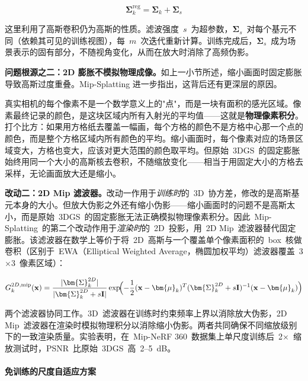 \begin{equation}
\bm{\Sigma}_k^{\mathrm{reg}} = \bm{\Sigma}_k + \bm{\Sigma}_s
\end{equation}

这里利用了高斯卷积仍为高斯的性质。滤波强度~$s$~为超参数，$\bm{\Sigma}_s$~对每个基元不同（依赖其可见的训练视图），每~$m$~次迭代重新计算。训练完成后，$\bm{\Sigma}_s$~成为场景表示的固有部分，不随视角变化，从而在放大时消除了高频伪影。

\textbf{问题根源之二：2D 膨胀不模拟物理成像。}如上一小节所述，缩小画面时固定膨胀导致高斯过度重叠。Mip-Splatting 进一步指出，这背后还有更深层的原因。

真实相机的每个像素不是一个数学意义上的"点"，而是一块有面积的感光区域。像素最终记录的颜色，是这块区域内所有入射光的平均值——这就是\textbf{物理像素积分}。打个比方：如果用方格纸去覆盖一幅画，每个方格的颜色不是方格中心那一个点的颜色，而是整个方格区域内所有颜色的平均。缩小画面时，每个像素对应的场景区域变大，方格也变大，应该对更大范围的颜色取平均。但原始~3DGS~的固定膨胀始终用同一个大小的高斯核去卷积，不随缩放变化——相当于用固定大小的方格去采样，无论画面放大还是缩小。

\textbf{改动二：2D Mip 滤波器。}改动一作用于\emph{训练时}的~3D~协方差，修改的是高斯基元本身的大小。但放大伪影之外还有缩小伪影——缩小画面时的问题不是高斯太小，而是原始~3DGS~的固定膨胀无法正确模拟物理像素积分。因此~Mip-Splatting~的第二个改动作用于\emph{渲染时}的~2D~投影，用~2D Mip~滤波器替代固定膨胀。该滤波器在数学上等价于将~2D~高斯与一个覆盖单个像素面积的~box~核做卷积（区别于~EWA（Elliptical Weighted Average，椭圆加权平均）滤波器覆盖~3$\times$3~像素区域）：

\[
G_k^{2D,\mathrm{mip}}(\mathbf{x}) = \frac{|\bm{\Sigma}_k^{2D}|}{|\bm{\Sigma}_k^{2D} + s\mathbf{I}|}\exp\!\Bigl(-\frac{1}{2}(\mathbf{x}-\bm{\mu}_k)^T(\bm{\Sigma}_k^{2D}+s\mathbf{I})^{-1}(\mathbf{x}-\bm{\mu}_k)\Bigr)
\]

两个滤波器协同工作。3D~滤波器在训练时约束频率上界以消除放大伪影，2D Mip~滤波器在渲染时模拟物理积分以消除缩小伪影。两者共同确保不同缩放级别下的一致渲染质量。实验表明，在~Mip-NeRF 360~数据集上单尺度训练后~2$\times$~缩放测试时，PSNR~比原始~3DGS~高~2--5~dB。

\paragraph{免训练的尺度自适应方案}


